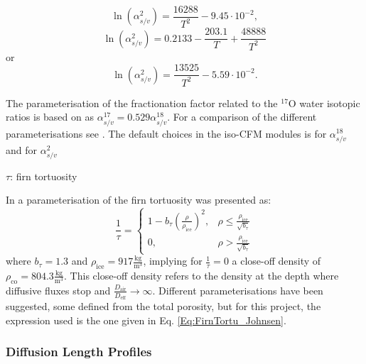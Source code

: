 \documentclass[../../CompleteThesis/Complete_1stDraft.tex]{subfiles}
\begin{document}
\begin{equation}
	\ln(\alpha_{s/v}^{2}) = \frac{16288}{T^2} - 9.45\cdot 10^{-2},
	\label{Eq:FractFact2_Merlivat}
\end{equation}
\begin{equation}
	\ln(\alpha_{s/v}^{2}) = 0.2133 - \frac{203.1}{T} + \frac{48888}{T^2}
	\label{Eq:FractFact2_Ellehoj}
\end{equation}
or
\begin{equation}
	\ln(\alpha_{s/v}^{2}) =  \frac{13525}{T^2} - 5.59\cdot 10^{-2}.
	\label{Eq:FractFact2_Lamb}
\end{equation}

The parameterisation of the fractionation factor related to the $^{17}$O water isotopic ratios is based on \cite[Barkan and Luz, 2005]{BarkanLuz2005} as $\alpha_{s/v}^{17} = 0.529 \alpha_{s/v}^{18}$. For a comparison of the different parameterisations see \cite[Gkinis et al., 2021]{Gkinis2021}. The default choices in the iso-CFM modules is \cite[Majoube 1971]{Majoube1970} for $\alpha_{s/v}^{18}$ and \cite[Merlivat and Nief, 1967]{MerlivatNief1967} for $\alpha_{s/v}^{2}$

$\tau$: firn tortuosity

In \cite[Johnsen et al., 2000]{Johnsen2000} a parameterisation of the firn tortuosity was presented as:
\begin{equation}
	\frac{1}{\tau} = \begin{cases}
		1 - b_{\tau}\left(\frac{\rho}{\rho_{\text{ice}}}\right)^2,  & \rho \leq \frac{\rho_{\text{ice}}}{\sqrt{b_{\tau}}} \\
		0, & \rho > \frac{\rho_{\text{ice}}}{\sqrt{b_{\tau}}}
	\end{cases}
	\label{Eq:FirnTortu_Johnsen}
\end{equation}
where $b_{\tau} = 1.3$ and $\rho_{\text{ice}} = 917 \frac{\text{kg}}{\text{m}^3}$, implying for $\frac{1}{\tau}=0$ a close-off density of $\rho_{\text{co}} = 804.3 \frac{\text{kg}}{\text{m}^3}$. This close-off density refers to the density at the depth where diffusive fluxes stop and $\frac{D_{\text{air}}}{D_{\text{eff}}}\rightarrow \infty$. Different parameterisations have been suggested, some defined from the total porosity, but for this project, the expression used is the one given in Eq. \ref{Eq:FirnTortu_Johnsen}.

\subsubsection[Diffusion Length Profiles]{Diffusion Length Profiles}
\label{Subsubsec:Ice_DiffusionAndDensification_IsoCFM_DiffLenProfile}
\end{document}
